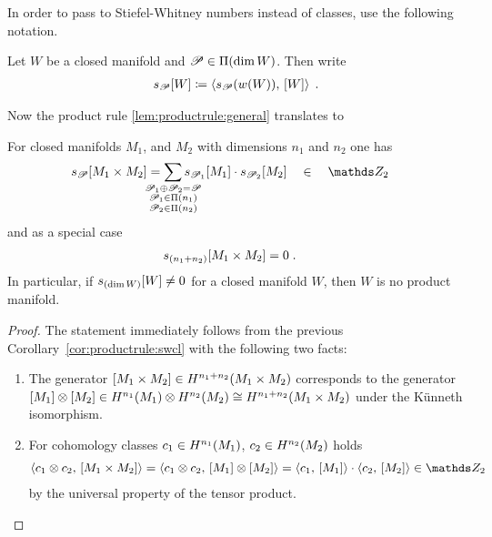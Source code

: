 In order to pass to Stiefel-Whitney numbers instead of classes, use
the following notation.
\begin{Def}
  Let $W$ be a closed manifold and $\mathscr{P}\in\Pi({\dim W})$.
  Then write
  \begin{gather*}
    s_{\mathscr{P}}[W] \coloneqq \left\langle s_{\mathscr{P}}({w}(W)),\, [W] \right\rangle
    \;.
  \end{gather*}
\end{Def}

Now the product rule \autoref{lem:productrule:general} translates to
\begin{Cor}
  For closed manifolds $M_1$, and $M_2$ with dimensions $n_1$ and
  $n_2$ one has
  \begin{align*}
    \snum{\Part}{M_1\times M_2}
    &= \sum_{\mathclap{\substack{
      \Part_1\concat\Part_2=\Part\\
    \Part_1\in\PartitionsOf{n_1}\\
    \Part_2\in\PartitionsOf{n_2}\\
    }}}
    \snum{\Part_1}{M_1} \cdot \snum{\Part_2}{M_2}
    \quad \in \quad \Zmod2
  \end{align*}
  and as a special case
  \begin{align}
    \label{eq:productrule:swnum}
    s_{(n_1+n_2)}[M_1\times M_2] &= 0
                                      \;.
  \end{align}
  In particular, if $s_{(\dim W)}[W]\neq 0$ for a closed manifold
  $W$, then $W$ is no product manifold.
  \begin{proof}
    The statement immediately follows from the previous
    Corollary~\autoref{cor:productrule:swcl} with the following
    two facts:
    \begin{enumerate}
    \item The generator $[M_1\times
        M_2]\in H^{n_1+n_2}(M_1\times M_2)$ corresponds to the generator
      $[M_1]\otimes[M_2]\in
      H^{n_1}(M_1)\otimes H^{n_2}(M_2)\cong H^{n_1+n_2}(M_1\times M_2)$
      under the Künneth isomorphism.
    \item For cohomology classes $c_1\in H^{n_1}(M_1)$, $c_2\in H^{n_2}(M_2)$ holds
      \begin{gather*}
        \capped{c_1\otimes c_2}{\fundcl{M_1\times M_2}}
        = \capped{c_1\otimes c_2}{\fundcl{M_1}\otimes\fundcl{M_2}}
        = \capped{c_1}{\fundcl{M_1}} \cdot \capped{c_2}{\fundcl{M_2}}
        \in \Zmod2
      \end{gather*}
      by the universal property of the tensor product.
      \qedhere
    \end{enumerate}    
  \end{proof}
\end{Cor}

